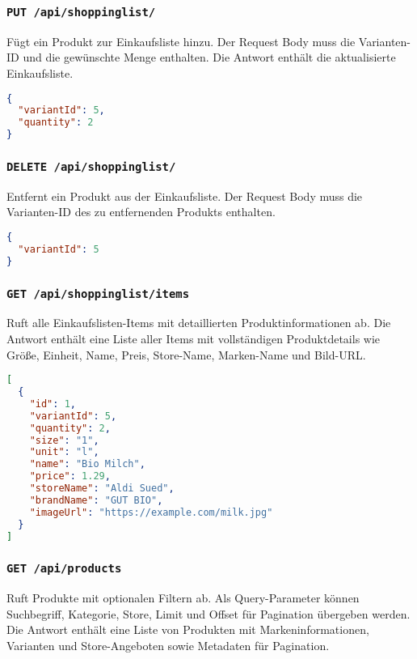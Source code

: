 \subsubsection{\texttt{PUT /api/shoppinglist/}}

Fügt ein Produkt zur Einkaufsliste hinzu. Der Request Body muss die Varianten-ID und die gewünschte Menge enthalten. Die Antwort enthält die aktualisierte Einkaufsliste.

\begin{lstlisting}[language=JSON]
{
  "variantId": 5,
  "quantity": 2
}
\end{lstlisting}

\subsubsection{\texttt{DELETE /api/shoppinglist/}}

Entfernt ein Produkt aus der Einkaufsliste. Der Request Body muss die Varianten-ID des zu entfernenden Produkts enthalten.

\begin{lstlisting}[language=JSON]
{
  "variantId": 5
}
\end{lstlisting}

\subsubsection{\texttt{GET /api/shoppinglist/items}}

Ruft alle Einkaufslisten-Items mit detaillierten Produktinformationen ab. Die Antwort enthält eine Liste aller Items mit vollständigen Produktdetails wie Größe, Einheit, Name, Preis, Store-Name, Marken-Name und Bild-URL.

\begin{lstlisting}[language=JSON]
[
  {
    "id": 1,
    "variantId": 5,
    "quantity": 2,
    "size": "1",
    "unit": "l",
    "name": "Bio Milch",
    "price": 1.29,
    "storeName": "Aldi Sued",
    "brandName": "GUT BIO",
    "imageUrl": "https://example.com/milk.jpg"
  }
]
\end{lstlisting}

\subsubsection{\texttt{GET /api/products}}

Ruft Produkte mit optionalen Filtern ab. Als Query-Parameter können Suchbegriff, Kategorie, Store, Limit und Offset für Pagination übergeben werden. Die Antwort enthält eine Liste von Produkten mit Markeninformationen, Varianten und Store-Angeboten sowie Metadaten für Pagination.

